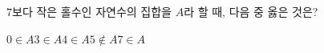 $7$보다 작은 홀수인 자연수의 집합을 $A$라 할 때, 다음 중 옳은 것은?
\begin{choices32}{$0\in A$}{$3\in A$}{$4\in A$}{$5\notin A$}{$7\in A$}\end{choices32}
